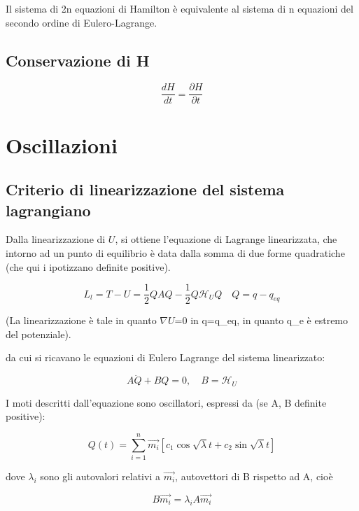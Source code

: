 \documentclass{article}
\begin{document}
Il sistema di 2n equazioni di Hamilton è equivalente al sistema di n equazioni del secondo ordine di Eulero-Lagrange.

\subsection{Conservazione di H}

\begin{equation}
    \frac{d H}{dt}= \frac{\partial H}{\partial t}
\end{equation}


\section{Oscillazioni}
\subsection{Criterio di linearizzazione del sistema lagrangiano}
Dalla linearizzazione di $U$, si ottiene l'equazione di Lagrange linearizzata, che intorno ad un punto di equilibrio è data dalla somma di due forme quadratiche (che qui i ipotizzano definite positive).

\begin{equation}
    L_l=T-U= \frac{1}{2}QAQ- \frac{1}{2}Q\mathcal{H}_UQ \quad Q=q-q_{eq}
\end{equation}

(La linearizzazione è tale in quanto $\nabla$$U$=0 in q=q\_{eq}, in quanto q\_e è estremo del potenziale).

da cui si ricavano le equazioni di Eulero Lagrange del sistema linearizzato:

\begin{equation}
    A\ddot{Q} + BQ = 0, \quad B = \mathcal{H}_U
\end{equation}

I moti descritti dall'equazione sono oscillatori, espressi da (se A, B definite positive):

\begin{equation}
    Q(t)=\sum_{i=1}^n \vec{m_i}[c_1 \cos{\sqrt{\lambda}t}+c_2 \sin{\sqrt{\lambda}t}]
\end{equation}

dove $\lambda_i$ sono gli autovalori relativi a $\Vec{m_i}$, autovettori di B rispetto ad A, cioè

\begin{equation}
    B \vec{m_i}=\lambda_iA\vec{m_i}
\end{equation}
\end{document}
